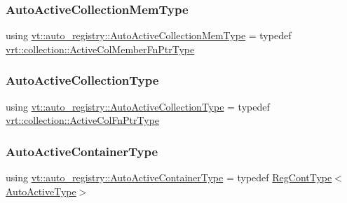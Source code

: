 \subsubsection{\texorpdfstring{Auto\+Active\+Collection\+Mem\+Type}{AutoActiveCollectionMemType}}
{\footnotesize\ttfamily using \hyperlink{namespacevt_1_1auto__registry_aa217123c03472f9bcee51300d638b16e}{vt\+::auto\+\_\+registry\+::\+Auto\+Active\+Collection\+Mem\+Type} = typedef \hyperlink{namespacevt_1_1vrt_1_1collection_aa4614a0de67301c62259b0763a86f473}{vrt\+::collection\+::\+Active\+Col\+Member\+Fn\+Ptr\+Type}}

\mbox{\label{namespacevt_1_1auto__registry_a3a45df4bb1c58e5178e3c0cf349baea4}} 
\subsubsection{\texorpdfstring{Auto\+Active\+Collection\+Type}{AutoActiveCollectionType}}
{\footnotesize\ttfamily using \hyperlink{namespacevt_1_1auto__registry_a3a45df4bb1c58e5178e3c0cf349baea4}{vt\+::auto\+\_\+registry\+::\+Auto\+Active\+Collection\+Type} = typedef \hyperlink{namespacevt_1_1vrt_1_1collection_ab2e800e37837a2afe33996fe8f5fabea}{vrt\+::collection\+::\+Active\+Col\+Fn\+Ptr\+Type}}

\mbox{\label{namespacevt_1_1auto__registry_a08dc8b065a2c2fd466ae6299eb9ca6b9}} 
\subsubsection{\texorpdfstring{Auto\+Active\+Container\+Type}{AutoActiveContainerType}}
{\footnotesize\ttfamily using \hyperlink{namespacevt_1_1auto__registry_a08dc8b065a2c2fd466ae6299eb9ca6b9}{vt\+::auto\+\_\+registry\+::\+Auto\+Active\+Container\+Type} = typedef \hyperlink{namespacevt_1_1auto__registry_a988a4943e4c8fe82b56f5b13bddceb2b}{Reg\+Cont\+Type}$<$\hyperlink{namespacevt_1_1auto__registry_adc4d91d5c7fe1b7d36f2c490ae14c9ac}{Auto\+Active\+Type}$>$}

